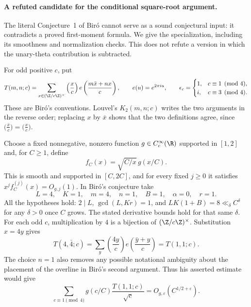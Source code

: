 \paragraph{A refuted candidate for the conditional square-root argument.}
The literal Conjecture~1 of Bir\'o \cite{A5Biro2026} cannot serve as a
sound conjectural input: it contradicts a proved first-moment formula.
We give the specialization, including its smoothness and normalization
checks.  This does not refute a version in which the unary-theta
contribution is subtracted.

For odd positive $c$, put
\[
 T(m,n;c)=\sum_{x\in(\Z/c\Z)^\times}
 \left(\frac{x}{c}\right)e\left(\frac{m\bar x+nx}{c}\right),
 \qquad e(u)=e^{2\pi i u},
 \qquad
 \epsilon_c=\begin{cases}1,&c\equiv1\pmod4,\\
                         i,&c\equiv3\pmod4.
            \end{cases}
\]
These are Bir\'o's conventions.  Louvel's $K_2(m,n;c)$ writes the two
arguments in the reverse order; replacing $x$ by $\bar x$ shows that
the two definitions agree, since
$\bigl(\frac{\bar x}{c}\bigr)=\bigl(\frac{x}{c}\bigr)$.

Choose a fixed nonnegative, nonzero function
$g\in C_c^\infty(\R)$ supported in $[1,2]$ and, for $C\geq1$, define
\[
 f_C(x)=\sqrt{C/x}\,g(x/C).
\]
This is smooth and supported in $[C,2C]$, and for every fixed
$j\geq0$ it satisfies
$x^j f_C^{(j)}(x)=O_{g,j}(1)$.
In Bir\'o's conjecture take
\[
 L=4,\quad K=1,\quad m=4,\quad n=1,
 \quad B=1,\quad\alpha=0,
 \quad r=1.
\]
All the hypotheses hold: $2\mid L$,
$\gcd(L,Kr)=1$, and $LK(1+B)=8\ll_\delta C^\delta$
for any $\delta>0$ once $C$ grows.  The stated derivative bounds hold
for that same $\delta$.  For each odd $c$, multiplication by $4$ is a
bijection of $(\Z/c\Z)^\times$.  Substitution $x=4y$ gives
\[
 T(4,\bar4;c)
 =\sum_y\left(\frac{4y}{c}\right)
 e\left(\frac{\bar y+y}{c}\right)
 =T(1,1;c).
\]
The choice $n=1$ also removes any possible notational ambiguity about
the placement of the overline in Bir\'o's second argument.
Thus his asserted estimate would give
\[
 \sum_{c\equiv1\pmod4}
 g(c/C)\frac{T(1,1;c)}{\sqrt c}
 =O_{g,\varepsilon}(C^{1/2+\varepsilon}).
\]

